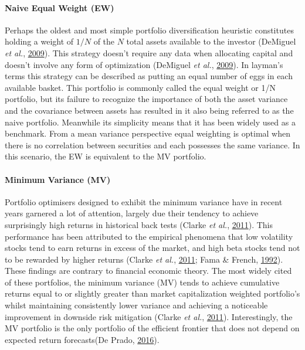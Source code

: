 \documentclass[11pt,preprint, authoryear]{elsarticle}
\numberwithin{equation}{section}
\numberwithin{figure}{section}
\numberwithin{table}{section}
\begin{document}
\hypertarget{naive-equal-weight-ew}{%
\paragraph{Naive Equal Weight (EW)}\label{naive-equal-weight-ew}}

Perhaps the oldest and most simple portfolio diversification heuristic
constitutes holding a weight of \(1/N\) of the \(N\) total assets
available to the investor (DeMiguel \emph{et al.},
\protect\hyperlink{ref-demiguel2009}{2009}). This strategy doesn't
require any data when allocating capital and doesn't involve any form of
optimization (DeMiguel \emph{et al.},
\protect\hyperlink{ref-demiguel2009}{2009}). In layman's terms this
strategy can be described as putting an equal number of eggs in each
available basket. This portfolio is commonly called the equal weight or
1/N portfolio, but its failure to recognize the importance of both the
asset variance and the covariance between assets has resulted in it also
being referred to as the naive portfolio. Meanwhile its simplicity means
that it has been widely used as a benchmark. From a mean variance
perspective equal weighting is optimal when there is no correlation
between securities and each possesses the same variance. In this
scenario, the EW is equivalent to the MV portfolio.

\hypertarget{minimum-variance-mv}{%
\paragraph{Minimum Variance (MV)}\label{minimum-variance-mv}}

Portfolio optimisers designed to exhibit the minimum variance have in
recent years garnered a lot of attention, largely due their tendency to
achieve surprisingly high returns in historical back tests (Clarke
\emph{et al.}, \protect\hyperlink{ref-clarke2011}{2011}). This
performance has been attributed to the empirical phenomena that low
volatility stocks tend to earn returns in excess of the market, and high
beta stocks tend not to be rewarded by higher returns (Clarke \emph{et
al.}, \protect\hyperlink{ref-clarke2011}{2011}; Fama \& French,
\protect\hyperlink{ref-fama1992}{1992}). These findings are contrary to
financial economic theory. The most widely cited of these portfolios,
the minimum variance (MV) tends to achieve cumulative returns equal to
or slightly greater than market capitalization weighted portfolio's
whilst maintaining consistently lower variance and achieving a
noticeable improvement in downside risk mitigation (Clarke \emph{et
al.}, \protect\hyperlink{ref-clarke2011}{2011}). Interestingly, the MV
portfolio is the only portfolio of the efficient frontier that does not
depend on expected return forecasts(De Prado,
\protect\hyperlink{ref-lopez}{2016}).
\end{document}
